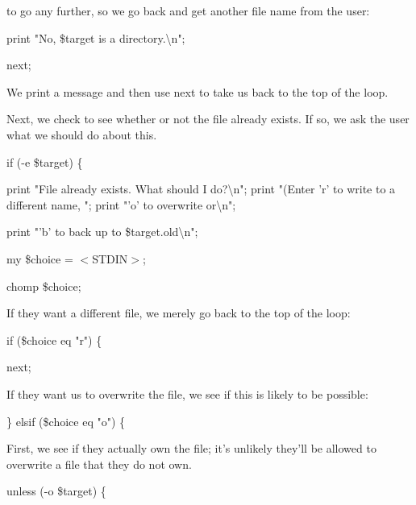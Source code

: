 \documentclass[a4paper,11pt]{book}
\begin{document}
\noindent to go any further, so we go back and get another file name from the user:

\noindent 

\noindent 

\noindent print "No, \$target is a directory.\textbackslash n";

\noindent next;

\noindent 

\noindent We print a message and then use next to take us back to the top of the loop.

\noindent 

\noindent Next, we check to see whether or not the file already exists. If so, we ask the user what we should do about this.

\noindent 

\noindent 

\noindent if (-e \$target) \{

\noindent print "File already exists. What should I do?\textbackslash n"; print "(Enter 'r' to write to a different name, "; print "'o' to overwrite or\textbackslash n";

\noindent print "'b' to back up to \$target.old\textbackslash n";

\noindent my \$choice = $<$STDIN$>$;

\noindent chomp \$choice;

\noindent 

\noindent If they want a different file, we merely go back to the top of the loop:

\noindent 

\noindent 

\noindent if (\$choice eq "r") \{

\noindent next;

\noindent 

\noindent If they want us to overwrite the file, we see if this is likely to be possible:

\noindent 

\noindent 

\noindent \} elsif (\$choice eq "o") \{

\noindent 

\noindent First, we see if they actually own the file; it's unlikely they'll be allowed to overwrite a file that they do not own.

\noindent 

\noindent 

\noindent unless (-o \$target) \{
\end{document}
